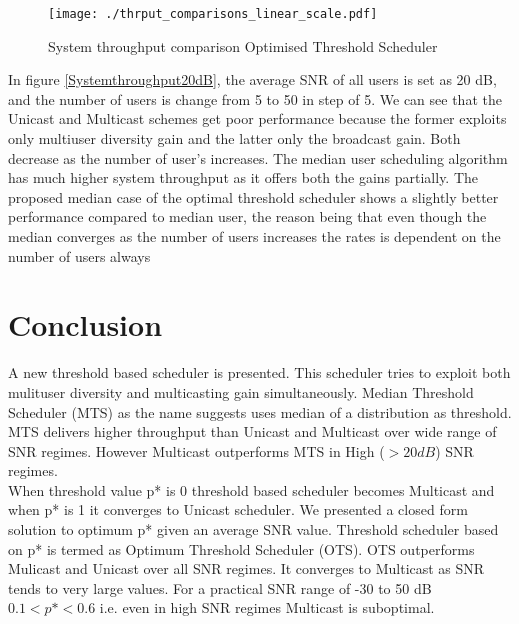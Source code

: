 \documentclass[conference]{IEEEtran}
\begin{document}
\begin{figure}[h!]
  \vspace{-10pt}
  \begin{center}
    \texttt{[image: ./thrput\_comparisons\_linear\_scale.pdf]}
  \end{center}
  \vspace{-10pt}
  \caption{System throughput comparison Optimised Threshold Scheduler}\label{Comparison of schedulers}
\end{figure}

In figure \ref{Systemthroughput20dB}, the average SNR of all users is set as 20 dB, and the number of users is change from 5 to 50 in step of 5. We can see that the Unicast and Multicast schemes get poor performance because the former exploits only multiuser diversity gain and the latter only the broadcast gain. Both decrease as the number of user’s increases. The median user scheduling algorithm has much higher system throughput as it offers both the gains partially. The proposed median case of the optimal threshold scheduler shows a slightly better performance compared to median user, the reason being that even though the median converges as the number of users increases the rates is dependent on the number of users always 




\section{Conclusion}
A new threshold based scheduler is presented. This scheduler tries to exploit both mulituser diversity and multicasting gain simultaneously. Median Threshold Scheduler (MTS) as the name suggests uses median of a distribution as threshold. MTS delivers higher throughput than Unicast and Multicast over wide range of SNR regimes. However Multicast outperforms MTS in High ($>20dB$) SNR regimes.\\

When threshold value p* is 0 threshold based scheduler becomes Multicast and when p* is 1 it converges to Unicast scheduler. We presented a closed form solution to optimum p* given an average SNR value. Threshold scheduler based on p* is termed as Optimum Threshold Scheduler (OTS). OTS outperforms Mulicast and Unicast over all SNR regimes. It converges to Multicast as SNR tends to very large values.
For a practical SNR range of -30 to 50 dB   $0.1<p*<0.6$  i.e. even in high SNR regimes Multicast is suboptimal. \\
\end{document}
